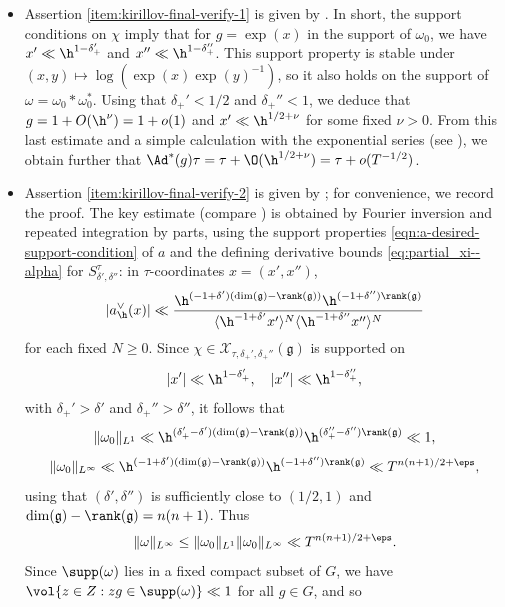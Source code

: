 \begin{itemize}
\item Assertion \eqref{item:kirillov-final-verify-1} is given by \cite[(14.13)]{2020arXiv201202187N}.  In short, the support conditions on $\chi$ imply that for $g=\exp(x)$ in the support of $\omega_0$, we have $x' \ll \h^{1-\delta_+'}$ and $x'' \ll \h^{1-\delta_+''}$.  This support property is stable under $(x, y) \mapsto \log(\exp(x) \exp(y)^{-1})$, so it also holds on the support of $\omega = \omega_0 \ast \omega_0^*$.  Using that $\delta_+ ' < 1/2$ and $\delta_+'' < 1$, we deduce that $g = 1 + O(\h^\nu) = 1 + o(1)$ and $x ' \ll \h^{1/2 + \nu}$ for some fixed $\nu > 0$.  From this last estimate and a simple calculation with the exponential series (see \cite[Lemma 13.9]{2020arXiv201202187N}), we obtain further that $\Ad^*(g) \tau = \tau + \O(\h^{1/2 + \nu}) = \tau + o(T^{-1/2})$.
\item Assertion \eqref{item:kirillov-final-verify-2} is given by \cite[(14.14)]{2020arXiv201202187N}; for convenience, we record the proof.  The key estimate (compare \cite[(14.6)]{2020arXiv201202187N}) is obtained by Fourier inversion and repeated integration by parts, using the support properties \eqref{eqn:a-desired-support-condition} of $a$ and the defining derivative bounds \eqref{eq:partial_xi--alpha} for $S_{\delta ', \delta ''}^{\tau}$: in $\tau$-coordinates $x = (x',x'')$,
  \[
    |a_{\h}^{\vee}(x)|
    \ll
    \frac{
      \h^{(-1+\delta')(\dim(\mathfrak{g})-\rank(\mathfrak{g}))}
      \h^{(-1+\delta'')\rank(\mathfrak{g})}
    }{
      \langle \h^{-1+\delta'} x' \rangle^N
      \langle \h^{-1+\delta''} x'' \rangle^N
    }
  \]
  for each fixed $N \geq 0$.  Since $\chi \in \mathcal{X}_{\tau,\delta_+',\delta_+''}(\mathfrak{g})$ is supported on
  \[
    |x'| \ll \h^{1-\delta_+'},
    \quad
    |x''| \ll \h^{1-\delta_+''},
  \]
  with $\delta_+' > \delta'$ and $\delta_+'' > \delta''$, it follows that
  \[
    \|\omega_0\|_{L^1}
    \ll
    \h^{(\delta_+'-\delta')(\dim(\mathfrak{g})-\rank(\mathfrak{g}))}
    \h^{(\delta_+''-\delta'')\rank(\mathfrak{g})}
    \ll 1,
  \]
  \[
    \|\omega_0\|_{L^\infty}
    \ll
    \h^{(-1+\delta')(\dim(\mathfrak{g})-\rank(\mathfrak{g}))}
    \h^{(-1+\delta'')\rank(\mathfrak{g})}
    \ll T^{n(n+1)/2+\eps},
  \]
  using that $(\delta',\delta'')$ is sufficiently close to $(1/2,1)$ and $\dim(\mathfrak{g})-\rank(\mathfrak{g}) = n(n+1)$.  Thus
  \[
    \|\omega\|_{L^\infty}
    \leq
    \|\omega_0\|_{L^1}\|\omega_0\|_{L^\infty}
    \ll T^{n(n+1)/2+\eps}.
  \]
  Since $\supp(\omega)$ lies in a fixed compact subset of $G$, we have $\vol\{z \in Z : zg \in \supp(\omega)\} \ll 1$ for all $g \in G$, and so

\end{itemize}
